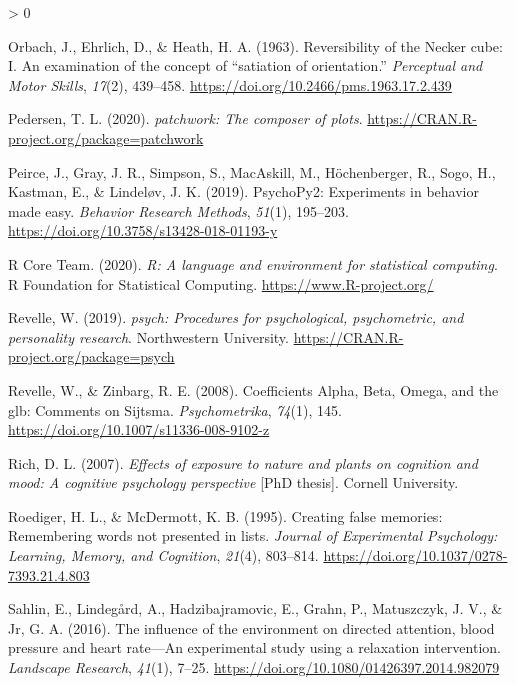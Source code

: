 \documentclass[
  english,
  pub,floatsintext]{apa6}
\newlength{\cslhangindent}
\newenvironment{CSLReferences}[2] %
 {%
  \setlength{\parindent}{0pt}
  \ifodd #1 \everypar{\setlength{\hangindent}{\cslhangindent}}\ignorespaces\fi
  \ifnum #2 > 0
  \setlength{\parskip}{#2\baselineskip}
  \fi
 }%
 {}
\begin{document}
\begin{CSLReferences}{1}{0}
\leavevmode\hypertarget{ref-Orbach.etal.1963}{}%
Orbach, J., Ehrlich, D., \& Heath, H. A. (1963). Reversibility of the {Necker} cube: {I}. {An} examination of the concept of {``satiation of orientation.''} \emph{Perceptual and Motor Skills}, \emph{17}(2), 439--458. \url{https://doi.org/10.2466/pms.1963.17.2.439}

\leavevmode\hypertarget{ref-R-patchwork}{}%
Pedersen, T. L. (2020). \emph{{patchwork}: The composer of plots}. \url{https://CRAN.R-project.org/package=patchwork}

\leavevmode\hypertarget{ref-Peirce.etal.2019}{}%
Peirce, J., Gray, J. R., Simpson, S., MacAskill, M., Höchenberger, R., Sogo, H., Kastman, E., \& Lindeløv, J. K. (2019). {PsychoPy2}: {Experiments} in behavior made easy. \emph{Behavior Research Methods}, \emph{51}(1), 195--203. \url{https://doi.org/10.3758/s13428-018-01193-y}

\leavevmode\hypertarget{ref-R-base}{}%
R Core Team. (2020). \emph{R: A language and environment for statistical computing}. R Foundation for Statistical Computing. \url{https://www.R-project.org/}

\leavevmode\hypertarget{ref-R-psych}{}%
Revelle, W. (2019). \emph{{psych}: Procedures for psychological, psychometric, and personality research}. Northwestern University. \url{https://CRAN.R-project.org/package=psych}

\leavevmode\hypertarget{ref-Revelle.Zinbarg.2008}{}%
Revelle, W., \& Zinbarg, R. E. (2008). Coefficients {Alpha}, {Beta}, {Omega}, and the glb: {Comments} on {Sijtsma}. \emph{Psychometrika}, \emph{74}(1), 145. \url{https://doi.org/10.1007/s11336-008-9102-z}

\leavevmode\hypertarget{ref-Rich.2007}{}%
Rich, D. L. (2007). \emph{Effects of exposure to nature and plants on cognition and mood: {A} cognitive psychology perspective} {[}PhD thesis{]}. Cornell University.

\leavevmode\hypertarget{ref-Roediger.McDermott.1995}{}%
Roediger, H. L., \& McDermott, K. B. (1995). Creating false memories: {Remembering} words not presented in lists. \emph{Journal of Experimental Psychology: Learning, Memory, and Cognition}, \emph{21}(4), 803--814. \url{https://doi.org/10.1037/0278-7393.21.4.803}

\leavevmode\hypertarget{ref-Sahlin.etal.2016}{}%
Sahlin, E., Lindegård, A., Hadzibajramovic, E., Grahn, P., Matuszczyk, J. V., \& Jr, G. A. (2016). The influence of the environment on directed attention, blood pressure and heart rate---{An} experimental study using a relaxation intervention. \emph{Landscape Research}, \emph{41}(1), 7--25. \url{https://doi.org/10.1080/01426397.2014.982079}


\end{CSLReferences}
\end{document}

